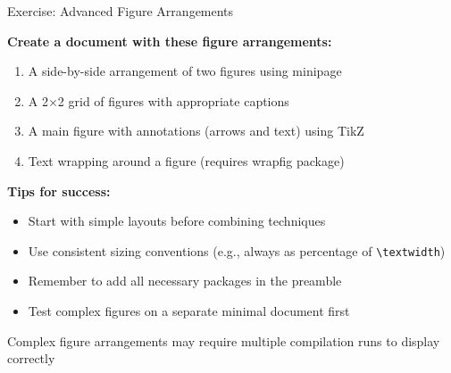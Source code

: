 \begin{frame}{Exercise: Advanced Figure Arrangements}
     \begin{practice}
          \textbf{Create a document with these figure arrangements:}
          \begin{enumerate}
               \item A side-by-side arrangement of two figures using minipage
               \item A 2×2 grid of figures with appropriate captions
               \item A main figure with annotations (arrows and text) using TikZ
               \item Text wrapping around a figure (requires wrapfig package)
          \end{enumerate}
     \end{practice}
     
     \textbf{Tips for success:}
     \begin{itemize}
          \item Start with simple layouts before combining techniques
          \item Use consistent sizing conventions (e.g., always as percentage of \texttt{\textbackslash textwidth})
          \item Remember to add all necessary packages in the preamble
          \item Test complex figures on a separate minimal document first
     \end{itemize}
     
     \begin{warning}
          Complex figure arrangements may require multiple compilation runs to display correctly
     \end{warning}
\end{frame}